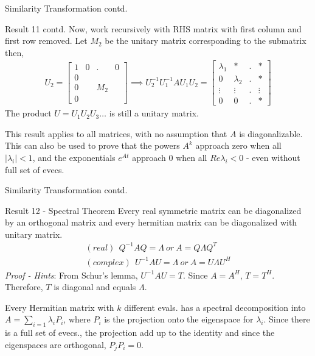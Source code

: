 \documentclass{beamer}
\begin{document}
\begin{frame}{Similarity Transformation contd.}
\begin{block}{Result 11 contd.}
Now, work recursively with RHS matrix with first column and first row removed. Let $M_2$ be the unitary matrix corresponding to the submatrix then,
\begin{align*}
U_2 = \begin{bmatrix}1&0&.&0\\0&&&\\0&&M_2&\\0&&&\end{bmatrix}\implies U_2^{-1}U_1^{-1}AU_1U_2 = \begin{bmatrix}\lambda_1&*&.&*\\0&\lambda_2&.&*\\\vdots&\vdots&.&\vdots\\0&0&.&*\end{bmatrix}
\end{align*}
The product $U = U_1U_2U_3\ldots$ is still a unitary matrix.
\end{block}
This result applies to all matrices, with no assumption that $A$ is diagonalizable. This can also be used to prove that the powers $A^k$ approach zero when all $|\lambda_i|<1$, and the exponentials $e^{At}$ approach $0$ when all $Re\lambda_i < 0$ - even without full set of evecs.
\end{frame}

\begin{frame}{Similarity Transformation contd.}
\begin{block}{Result 12 - Spectral Theorem}
Every real symmetric matrix can be diagonalized by an orthogonal matrix and every hermitian matrix can be diagonalized with unitary matrix.
\begin{align*}
(real) \ \ Q^{-1}AQ = \Lambda \ or\  A = Q\Lambda Q^T\\
(complex) \ \ U^{-1}AU = \Lambda \ or\  A = U\Lambda U^{H}
\end{align*}
\textit{Proof - Hints}: From Schur's lemma, $U^{-1}AU = T$. Since $A = A^{H}$, $T = T^H$. Therefore, $T$ is diagonal and equals $\Lambda$.
\end{block}
Every Hermitian matrix with $k$ different evals. has a spectral decomposition into $A= \sum_{i=1}\lambda_i P_i$, where $P_i$ is the projection onto the eigenspace for $\lambda_i$. Since there is a full set of evecs., the projection add up to the identity and since the eigenspaces are orthogonal, $P_jP_i = 0$.
\end{frame}
\end{document}
